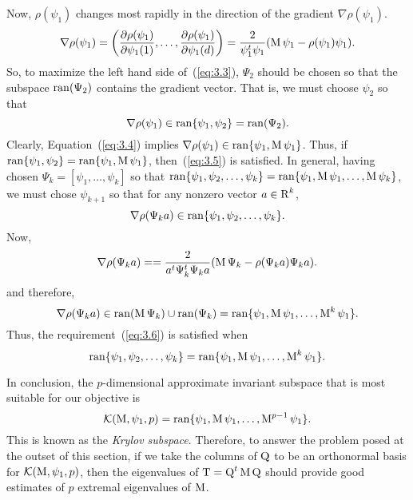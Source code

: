 Now, $\rho(\psi_1)$ changes most rapidly in the direction of the gradient
$\nabla \rho(\psi_1)$.
\begin{equation}
  \label{eq:3.4}
\nabla \rho(\psi_1) = \left(\frac{\partial \rho(\psi_1)}{\partial \psi_1(1)}, \dots,
\frac{\partial \rho(\psi_1)}{\partial \psi_1(d)}\right)
 = \frac{2}{\psi_1^t\psi_1} (\operatorname{M}\psi_1 - \rho(\psi_1)\psi_1).
\end{equation}
So, to maximize the left hand side of~(\ref{eq:3.3}), $\Psi_2$ should be chosen
so that the subspace $\operatorname{ran}(\Psi_2)$ contains the gradient vector.
That is, we must choose $\psi_2$ so that
\begin{equation}
\label{eq:3.5}
\nabla \rho(\psi_1) \in \operatorname{ran}\{\psi_1, \psi_2\} = \operatorname{ran}(\Psi_2).
\end{equation}
Clearly, Equation~(\ref{eq:3.4}) implies 
$\nabla \rho(\psi_1) \in \operatorname{ran}\{\psi_1, \operatorname{M}\psi_1\}$.
Thus, if $\operatorname{ran}\{\psi_1, \psi_2\} = \operatorname{ran}\{\psi_1, \operatorname{M}\psi_1\}$, 
then~(\ref{eq:3.5}) is satisfied.
%
%
%
%
In general, having chosen $\Psi_k = [\psi_1, \dots,  \psi_k]$ so that
$\operatorname{ran}\{\psi_1, \psi_2, \dots, \psi_k\} = \operatorname{ran}\{\psi_1, \operatorname{M}\psi_1, \dots,
\operatorname{M}\psi_k\}$,
we must chose $\psi_{k+1}$ so that for any nonzero vector $a\in \operatorname{R}^k$,
\begin{equation}
\label{eq:3.6}
\nabla \rho(\Psi_ka) \in \operatorname{ran}\{\psi_1, \psi_2, \dots, \psi_k\}.
\end{equation}
Now,
\[
\nabla \rho(\Psi_ka)  = 
 = \frac{2}{a^t\Psi_k^t\Psi_ka} (\operatorname{M}\Psi_k - \rho(\Psi_ka)\Psi_ka).
\]
and therefore,
\[
\nabla \rho(\Psi_ka)  \in 
\operatorname{ran}(\operatorname{M}\Psi_k) \cup \operatorname{ran}(\Psi_k) = \operatorname{ran}\{\psi_1, \operatorname{M}\psi_1, \dots, \operatorname{M}^k\psi_1\}.
\]
Thus, the requirement~(\ref{eq:3.6}) is satisfied when 
\[
\operatorname{ran}\{\psi_1, \psi_2, \dots, \psi_k\} = \operatorname{ran}\{\psi_1, \operatorname{M}\psi_1, \dots,
\operatorname{M}^k\psi_1\}.
\]

In conclusion, the $p$-dimensional approximate invariant subspace that is most suitable
for our objective is
\[
\mathcal{K}(\operatorname{M}, \psi_1, p) = \operatorname{ran}\{\psi_1, \operatorname{M}\psi_1, \dots, \operatorname{M}^{p-1}\psi_1\}.
\]
This is known as the \emph{Krylov subspace}. Therefore, to answer the problem posed at the outset
of this section, if we take the columns of $\operatorname{Q}$ to be an orthonormal basis for 
$\mathcal{K}(\operatorname{M},\psi_1, p)$, then the eigenvalues of $\operatorname{T} = \operatorname{Q}^t\operatorname{M}\operatorname{Q}$ should provide good
estimates of $p$ extremal eigenvalues of $\operatorname{M}$. 
%
%
%
%
